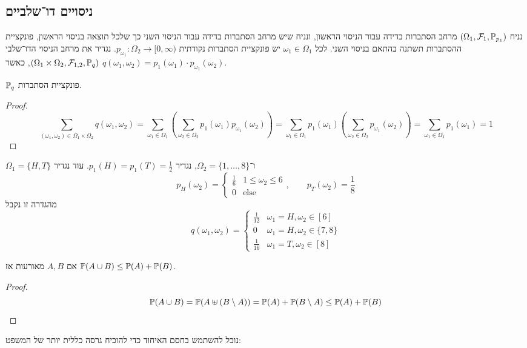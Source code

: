 \subsection{ניסויים דו־שלביים}
נניח $(\Omega_1, \mathcal{F}_1, \mathbb{P}_{p_1})$ מרחב הסתברות בדידה עבור הניסוי הראשון, ונניח שיש מרחב הסתברות בדידה עבור הניסוי השני כך שלכל תוצאה בניסוי הראשון, פונקציית ההסתברות תשתנה בהתאם בניסוי השני.
לכל $\omega_1 \in \Omega_1$ יש פונקציית הסתברות נקודתית $p_{\omega_1} : \Omega_2 \to [0, \infty)$.
נגדיר את מרחב הניסוי הדו־שלבי $(\Omega_1 \times \Omega_2, \mathcal{F}_{1, 2}, \mathbb{P}_q)$,
כאשר $q(\omega_1, \omega_2) = p_1(\omega_1) \cdot p_{\omega_1}(\omega_2)$.
\begin{proposition}
	$\mathbb{P}_q$ פונקציית הסתברות.
\end{proposition}
\begin{proof}
	\[
		\sum_{(\omega_1, \omega_2) \in \Omega_1 \times \Omega_2} q(\omega_1, \omega_2)
		= \sum_{\omega_1 \in \Omega_1} \left( \sum_{\omega_2 \in \Omega_2} p_1(\omega_1) p_{\omega_1}(\omega_2) \right)
		= \sum_{\omega_1 \in \Omega_1} p_1(\omega_1) \left( \sum_{\omega_2 \in \Omega_2} p_{\omega_1}(\omega_2) \right)
		= \sum_{\omega_1 \in \Omega_1} p_1(\omega_1)
		= 1
	\]
\end{proof}
\begin{example}
	$\Omega_1 = \{H, T\}$ ו־$\Omega_2 = \{1, \dots, 8\}$, נגדיר $p_1(H) = p_1(T) = \frac{1}{2}$.
	עוד נגדיר
	\[
		p_H(\omega_2) = \begin{cases}
			\frac{1}{6} & 1 \le \omega_2 \le 6 \\
			0 & \text{else}
		\end{cases},
		\qquad
		p_T(\omega_2) = \frac{1}{8}
	\]
	מהגדרה זו נקבל
	\[
		q(\omega_1, \omega_2) = \begin{cases}
			\frac{1}{12} & \omega_1 = H, \omega_2 \in [6] \\
			0 & \omega_1 = H, \omega_2 \in \{7, 8\} \\
			\frac{1}{16} & \omega_1 = T, \omega_2 \in [8]
		\end{cases}
	\]
\end{example}
\begin{theorem}
	אם $A, B$ מאורעות אז $\mathbb{P}(A \cup B) \le \mathbb{P}(A) + \mathbb{P}(B)$.
\end{theorem}
\begin{proof}
	\[
		\mathbb{P}(A \cup B)
		= \mathbb{P}(A \uplus (B \setminus A))
		= \mathbb{P}(A) + \mathbb{P}(B \setminus A)
		\le \mathbb{P}(A) + \mathbb{P}(B)
	\]
\end{proof}
נוכל להשתמש בחסם האיחוד כדי להוכיח גרסה כללית יותר של המשפט:

